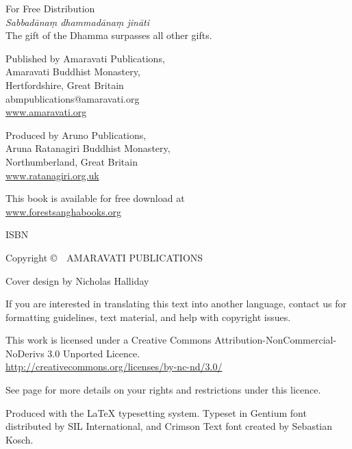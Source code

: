 {\small\setlength{\parskip}{0.8em}\setlength{\parindent}{0em}%
{\raggedright%

\thetitle

For Free Distribution\\
\emph{Sabbadānaṃ dhammadānaṃ jināti}\\
The gift of the Dhamma surpasses all other gifts.

Published by Amaravati Publications,\\
Amaravati Buddhist Monastery,\\
Hertfordshire, Great Britain\\
abmpublications@amaravati.org\\
\href{http://amaravati.org}{www.amaravati.org}

Produced by Aruno Publications,\\
Aruna Ratanagiri Buddhist Monastery,\\
Northumberland, Great Britain\\
\href{http://ratanagiri.org.uk/}{www.ratanagiri.org.uk}

This book is available for free download at\\
\href{http://forestsanghabooks.org/}{www.forestsanghabooks.org}

ISBN \theISBN

Copyright \copyright\ \the\year\ AMARAVATI PUBLICATIONS

Cover design by Nicholas Halliday

\vfill

{\footnotesize
If you are interested in translating this text into another language, contact us for formatting guidelines, text material, and help with copyright issues.


This work is licensed under a Creative Commons Attribution-NonCommercial-NoDerivs 3.0 Unported Licence.\\
\href{http://creativecommons.org/licenses/by-nc-nd/3.0/}{http://creativecommons.org/licenses/by-nc-nd/3.0/}

See page \pageref{copyright-details} for more details on your rights and restrictions under this licence.

Produced with the {\selectfont\LaTeX} typesetting system. Typeset in Gentium font distributed by SIL International, and Crimson Text font created by Sebastian Kosch.

}}}
